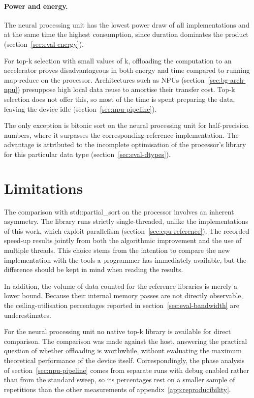 \paragraph{Power and energy.} The neural processing unit has the lowest power
draw of all implementations and at the same time the highest consumption, since
duration dominates the product (section~\ref{sec:eval-energy}).

For top-k selection with small values of k, offloading the computation to an
accelerator proves disadvantageous in both energy and time compared to running
map-reduce on the processor. Architectures such as NPUs
(section~\ref{sec:bg-arch-npu}) presuppose high local data reuse to amortise
their transfer cost. Top-k selection does not offer this, so most of the time
is spent preparing the data, leaving the device idle
(section~\ref{sec:npu-pipeline}).

The only exception is bitonic sort on the neural processing unit for
half-precision numbers, where it surpasses the corresponding reference
implementation. The advantage is attributed to the incomplete optimisation of
the processor's library for this particular data type
(section~\ref{sec:eval-dtypes}).

\section{Limitations}
\label{sec:concl-limitations}

The comparison with std::partial\_sort on the processor involves an inherent
asymmetry. The library runs strictly single-threaded, unlike the
implementations of this work, which exploit parallelism
(section~\ref{sec:cpu-reference}). The recorded speed-up results jointly from
both the algorithmic improvement and the use of multiple threads. This choice
stems from the intention to compare the new implementation with the tools a
programmer has immediately available, but the difference should be kept in mind
when reading the results.

In addition, the volume of data counted for the reference libraries is merely a
lower bound. Because their internal memory passes are not directly observable,
the ceiling-utilisation percentages reported in
section~\ref{sec:eval-bandwidth} are underestimates.

For the neural processing unit no native top-k library is available for direct
comparison. The comparison was made against the host, answering the practical
question of whether offloading is worthwhile, without evaluating the maximum
theoretical performance of the device itself. Correspondingly, the phase
analysis of section~\ref{sec:npu-pipeline} comes from separate runs with debug
enabled rather than from the standard sweep, so its percentages rest on a
smaller sample of repetitions than the other measurements of
appendix~\ref{app:reproducibility}.


